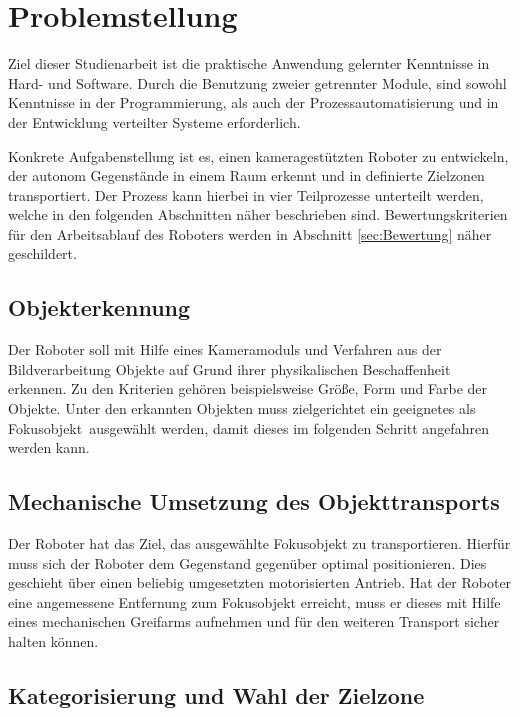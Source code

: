 \chapter{Problemstellung}
\label{cha:Problemstellung}

Ziel dieser Studienarbeit ist die praktische Anwendung gelernter Kenntnisse in Hard- und Software. Durch die Benutzung zweier getrennter Module, sind sowohl Kenntnisse in der Programmierung, als auch der Prozessautomatisierung und in der Entwicklung verteilter Systeme erforderlich.

Konkrete Aufgabenstellung ist es, einen kameragestützten Roboter zu entwickeln, der autonom Gegenstände in einem Raum erkennt und in definierte Zielzonen transportiert. Der Prozess kann hierbei in vier Teilprozesse unterteilt werden, welche in den folgenden Abschnitten näher beschrieben sind. Bewertungskriterien für den Arbeitsablauf des Roboters werden in Abschnitt \ref{sec:Bewertung} näher geschildert.

\section{Objekterkennung} 
\label{sec:Erkennung}
Der Roboter soll mit Hilfe eines Kameramoduls und Verfahren aus der Bildverarbeitung Objekte auf Grund ihrer physikalischen Beschaffenheit erkennen. Zu den Kriterien gehören beispielsweise Größe, Form und Farbe der Objekte. Unter den erkannten Objekten muss zielgerichtet ein geeignetes als \glqq Fokusobjekt\grqq\ ausgewählt werden, damit dieses im folgenden Schritt angefahren werden kann.

\section{Mechanische Umsetzung des Objekttransports}
\label{sec:Transport}

Der Roboter hat das Ziel, das ausgewählte Fokusobjekt zu transportieren. Hierfür muss sich der Roboter dem Gegenstand gegenüber optimal positionieren. Dies geschieht über einen beliebig umgesetzten motorisierten Antrieb. Hat der Roboter eine angemessene Entfernung zum Fokusobjekt erreicht, muss er  dieses mit Hilfe eines mechanischen Greifarms aufnehmen und für den weiteren Transport sicher halten können.

\section{Kategorisierung und Wahl der Zielzone}

